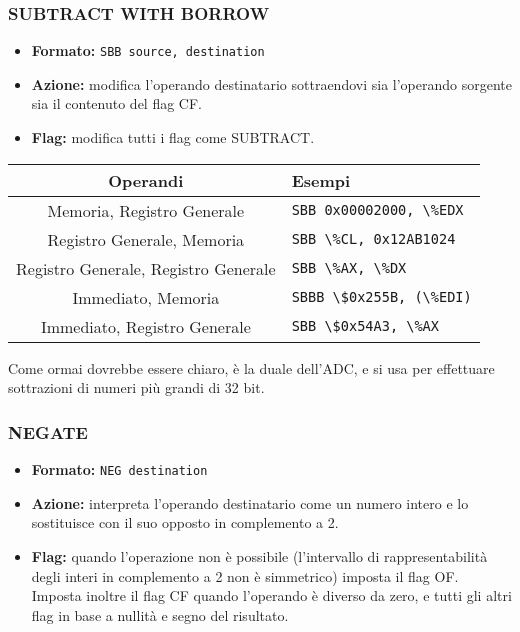 \documentclass[a4paper,11pt]{article}
\begin{document}
\subsubsection{SUBTRACT WITH BORROW}
\begin{itemize}
	\item \textbf{Formato:} \lstinline|SBB source, destination|
	\item \textbf{Azione:} modifica l'operando destinatario sottraendovi sia l'operando sorgente sia il contenuto del flag CF.
	\item \textbf{Flag:} modifica tutti i flag come SUBTRACT. 
\end{itemize}

		\begin{table}[H]
		\center {}
			\begin{tabular} { c | p{5cm} }
				\bfseries Operandi & \bfseries Esempi \\
				\hline
				Memoria, Registro Generale & \lstinline|SBB 0x00002000, \%EDX| \\ 
				Registro Generale, Memoria & \lstinline|SBB \%CL, 0x12AB1024| \\ 
				Registro Generale, Registro Generale & \lstinline|SBB \%AX, \%DX| \\ 
				Immediato, Memoria & \lstinline|SBBB \$0x255B, (\%EDI)| \\ 
				Immediato, Registro Generale & \lstinline|SBB \$0x54A3, \%AX|
			\end{tabular}
		\end{table}

Come ormai dovrebbe essere chiaro, è la duale dell'ADC, e si usa per effettuare sottrazioni di numeri più grandi di 32 bit.

\subsubsection{NEGATE}
\begin{itemize}
	\item \textbf{Formato:} \lstinline|NEG destination|
	\item \textbf{Azione:} interpreta l'operando destinatario come un numero intero e lo sostituisce con il suo opposto in complemento a 2. 
	\item \textbf{Flag:} quando l'operazione non è possibile (l'intervallo di rappresentabilità degli interi in complemento a 2 non è simmetrico) imposta il flag OF.
		Imposta inoltre il flag CF quando l'operando è diverso da zero, e tutti gli altri flag in base a nullità e segno del risultato. 
\end{itemize}
\end{document}
